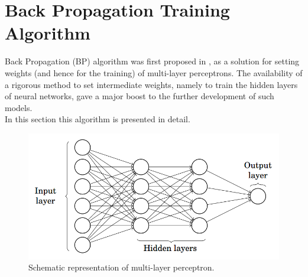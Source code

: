 \documentclass[%
    corpo=11pt,
    twoside,
    stile=classica,
    oldstyle,
    autoretitolo,
    tipotesi=magistrale,
    greek,
    evenboxes,
    english
]{toptesi}
\begin{document}
\section{Back Propagation Training Algorithm}
Back Propagation (BP) algorithm was first proposed in \cite{back}, as a solution for setting weights (and hence for the training) of multi-layer perceptrons. 
The availability of a rigorous method to set intermediate weights, namely to train the hidden layers of neural networks, gave a major boost to the further development of such models. \\
In this section this algorithm is presented in detail. \\
\begin{figure}[h]
\centering
\includegraphics[width=\textwidth]{pictures/multilayer-perceptron.png}
\caption{Schematic representation of multi-layer perceptron.}
\label{fig:mlp}
\end{figure}
\end{document}
